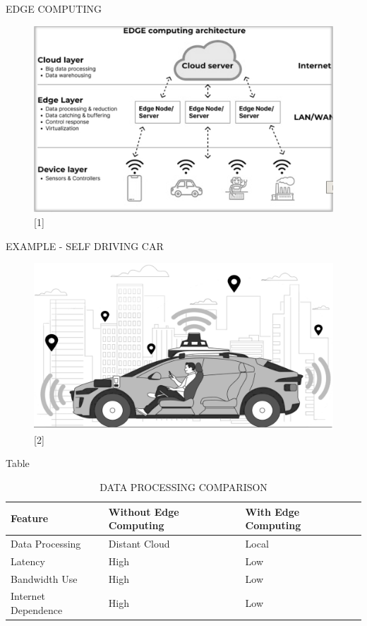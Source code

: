 \documentclass[aspectratio=169,xcolor=dvipsnames]{beamer}
\begin{document}
\begin{frame}{EDGE COMPUTING}
    \begin{figure}
    \includegraphics[width=0.6\linewidth]{edge.png}
    \caption{[1] }
    \end{figure}
\end{frame}
\begin{frame}{EXAMPLE - SELF DRIVING CAR}
    \begin{figure}
    \includegraphics[width=0.7\linewidth]{carexample.png}
    \caption{[2]}
    \end{figure}
\end{frame}
\begin{frame}{Table}
    \begin{table}
        \begin{tabular}{l l l}
            \toprule
            \textbf{Feature} & \textbf{Without Edge Computing } & \textbf{With Edge Computing} \\
            \midrule
            Data Processing         & Distant Cloud           & Local               \\
            Latency         & High           & Low               \\
            Bandwidth Use         & High           & Low               \\
            Internet Dependence         & High           & Low               \\
            \bottomrule
        \end{tabular}
        \caption{DATA PROCESSING COMPARISON}
    \end{table}
\end{frame}
\end{document}
